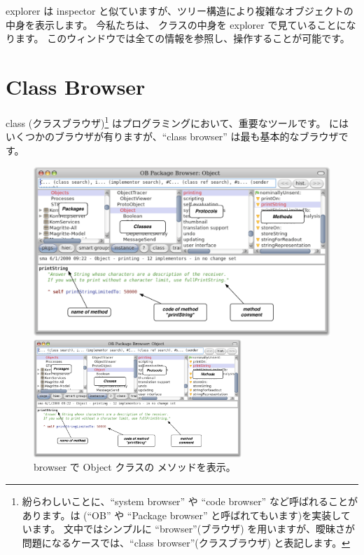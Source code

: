 \documentclass[a4paper,10pt,twoside]{book}
\begin{document}
explorer は inspector と似ていますが、ツリー構造により複雑なオブジェクトの中身を表示します。
今私たちは、 クラスの中身を explorer で見ていることになります。
このウィンドウでは全ての情報を参照し、操作することが可能です。

\section{Class Browser}

class (クラスブラウザ)\footnote{
紛らわしいことに、``system browser'' や ``code browser'' など呼ばれることがあります。\pharo は  (``OB'' や ``Package browser'' と呼ばれてもいます)を実装しています。
文中ではシンプルに ``browser''(ブラウザ) を用いますが、曖昧さが問題になるケースでは、``class browser''(クラスブラウザ) と表記します。} はプログラミングにおいて、重要なツールです。
\pharo にはいくつかのブラウザが有りますが、``class browser'' は最も基本的なブラウザです。



\begin{figure}[htb]
\ifluluelse
	{\centerline {\includegraphics[width=\textwidth]{ClassBrowser1}}}
	{\centerline {\includegraphics[width=0.7\textwidth]{ClassBrowser1}}}
\caption{browser で Object クラスの  メソッドを表示。
}
\end{figure}
\end{document}
